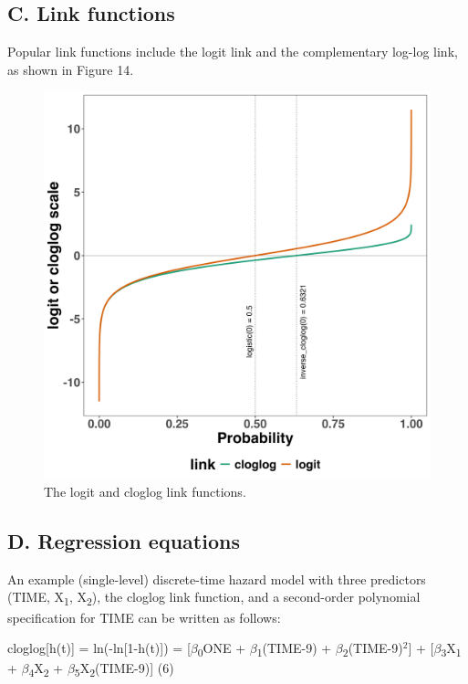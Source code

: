 \documentclass[
  man, donotrepeattitle,floatsintext]{apa6}
\begin{document}
\subsection{C. Link functions}\label{c.-link-functions}

Popular link functions include the logit link and the complementary log-log link, as shown in Figure 14.



\begin{figure}[H]

{\centering \includegraphics[width=0.8\linewidth,height=0.67\textheight,]{../Tutorial_2_Bayesian/figures/linkfunctions} 

}

\caption{The logit and cloglog link functions.}\label{fig:plot-link-functions}
\end{figure}

\subsection{D. Regression equations}\label{d.-regression-equations}

An example (single-level) discrete-time hazard model with three predictors (TIME, X\textsubscript{1}, X\textsubscript{2}), the cloglog link function, and a second-order polynomial specification for TIME can be written as follows:

\noindent cloglog{[}h(t){]} = ln(-ln{[}1-h(t){]}) = {[}\(\beta\)\textsubscript{0}ONE + \(\beta\)\textsubscript{1}(TIME-9) + \(\beta\)\textsubscript{2}(TIME-9)\(^2\){]} + {[}\(\beta\)\textsubscript{3}X\textsubscript{1} + \(\beta\)\textsubscript{4}X\textsubscript{2} + \(\beta\)\textsubscript{5}X\textsubscript{2}(TIME-9){]} \hfill  (6)
\end{document}
